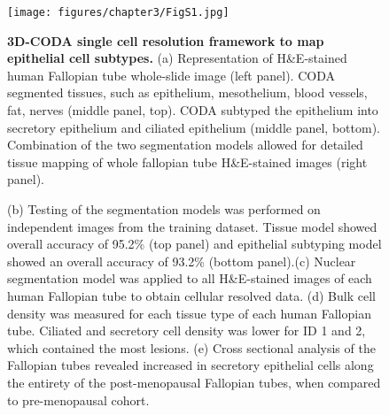 \begin{refsection}
    \begin{figure}[p]
        \begin{center}
            \texttt{[image: figures/chapter3/FigS1.jpg]}
            \captionsetup{font=small}
            \caption{ \textbf{3D-CODA single cell resolution framework to map epithelial cell subtypes.} (a) Representation of H\&E-stained human Fallopian tube whole-slide image (left panel). CODA segmented tissues, such as epithelium, mesothelium, blood vessels, fat, nerves (middle panel, top). CODA subtyped the epithelium into secretory epithelium and ciliated epithelium (middle panel, bottom). Combination of the two segmentation models allowed for detailed tissue mapping of whole fallopian tube H\&E-stained images (right panel).}
            \label{chapter3_figS1}
        \end{center}
    \end{figure}
    
    \begin{figure}[h!]
        \ContinuedFloat
        \captionsetup{font=small}
        \caption[]{(b) Testing of the segmentation models was performed on independent images from the training dataset. Tissue model showed overall accuracy of 95.2\% (top panel) and epithelial subtyping model showed an overall accuracy of 93.2\% (bottom panel).(c) Nuclear segmentation model was applied to all H\&E-stained images of each human Fallopian tube to obtain cellular resolved data. (d) Bulk cell density was measured for each tissue type of each human Fallopian tube. Ciliated and secretory cell density was lower for ID 1 and 2, which contained the most lesions. (e) Cross sectional analysis of the Fallopian tubes revealed increased in secretory epithelial cells along the entirety of the post-menopausal Fallopian tubes, when compared to pre-menopausal cohort.}
    \end{figure}
    

\end{refsection}
